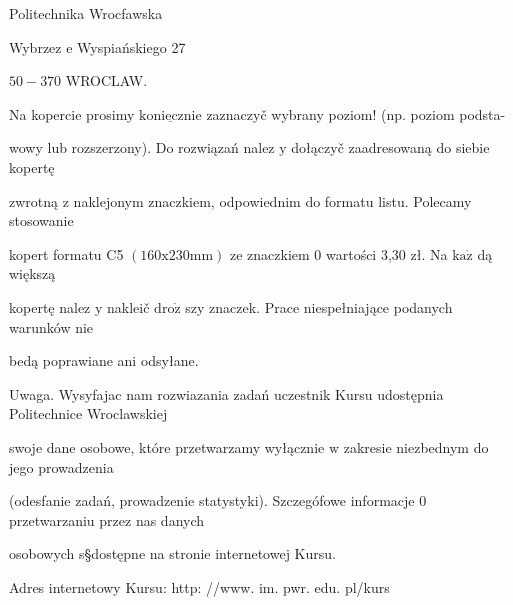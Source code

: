 \documentclass[a4paper,12pt]{article}
\begin{document}
Politechnika Wrocfawska

Wybrzez $\mathrm{e}$ Wyspiańskiego 27

$50-370$ WROCLAW.

Na kopercie prosimy $\underline{\mathrm{k}\mathrm{o}\mathrm{n}\mathrm{i}\mathrm{e}\mathrm{c}\mathrm{z}\mathrm{n}\mathrm{i}\mathrm{e}}$ zaznaczyč wybrany poziom! (np. poziom podsta-

wowy lub rozszerzony). Do rozwiązań nalez $\mathrm{y}$ dołączyč zaadresowaną do siebie kopertę

zwrotną $\mathrm{z}$ naklejonym znaczkiem, odpowiednim do formatu listu. Polecamy stosowanie

kopert formatu C5 $(160\mathrm{x}230\mathrm{m}\mathrm{m})$ ze znaczkiem $0$ wartości 3,30 zł. Na $\mathrm{k}\mathrm{a}\dot{\mathrm{z}}$ dą większą

kopertę nalez $\mathrm{y}$ nakleič $\mathrm{d}\mathrm{r}\mathrm{o}\dot{\mathrm{z}}$ szy znaczek. Prace niespełniające podanych warunków nie

bedą poprawiane ani odsyłane.

Uwaga. Wysyfajac nam rozwiazania zadań uczestnik Kursu udostępnia Politechnice Wroclawskiej

swoje dane osobowe, które przetwarzamy wyłącznie $\mathrm{w}$ zakresie niezbednym do jego prowadzenia

(odesfanie zadań, prowadzenie statystyki). Szczegófowe informacje $0$ przetwarzaniu przez nas danych

osobowych s\S dostępne na stronie internetowej Kursu.

Adres internetowy Kursu: http: //www. im. pwr. edu. pl/kurs
\end{document}
